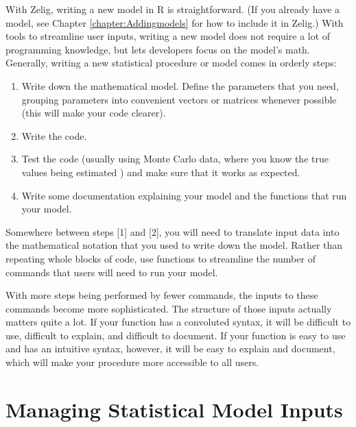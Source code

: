 With Zelig, writing a new model in R is straightforward.  (If you
already have a model, see Chapter \ref{chapter:Addingmodels} for how to include it in
Zelig.)  With tools to streamline user inputs, writing a new model
does not require a lot of programming knowledge, but lets developers
focus on the model's math.  Generally, writing a new statistical
procedure or model comes in orderly steps:  
\begin{enumerate}
\item Write down the mathematical model. Define the parameters that
you need, grouping parameters into convenient vectors or matrices
whenever possible (this will make your code clearer).  
\item Write the code.  
\item Test the code (usually using Monte Carlo data, where you know
the true values being estimated ) and make sure
that it works as expected. 
\item Write some documentation explaining your model and the functions
that run your model.  
\end{enumerate}
Somewhere between steps [1] and [2], you will need to translate input
data into the mathematical notation that you used to write down the
model.  Rather than repeating whole blocks of code, use functions to
streamline the number of commands that users will need to run your
model.  

With more steps being performed by fewer commands, the inputs to these
commands become more sophisticated.  The structure of those inputs
actually matters quite a lot.  If your function has a convoluted
syntax, it will be difficult to use, difficult to explain, and
difficult to document.  If your function is easy to use and has an
intuitive syntax, however, it will be easy to explain and document,
which will make your procedure more accessible to all users.

\section{Managing Statistical Model Inputs}
\label{ui}  

